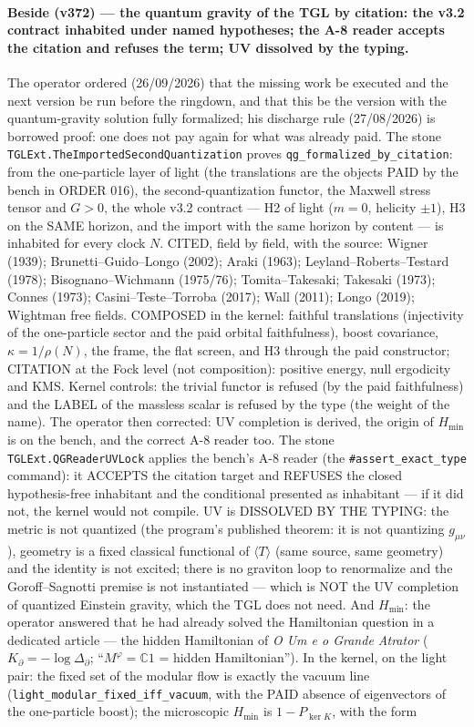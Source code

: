 \documentclass[11pt]{article}
\theoremstyle{definition}\newtheorem{deriv}{Derivation}
\begin{document}
\paragraph*{Beside (v372) --- the quantum gravity of the TGL by citation: the v3.2 contract inhabited under named hypotheses; the A-8 reader accepts the citation and refuses the term; UV dissolved by the typing.} The operator ordered (26/09/2026) that the missing work be executed and the next version be run before the ringdown, and that this be the version with the quantum-gravity solution fully formalized; his discharge rule (27/08/2026) is borrowed proof: one does not pay again for what was already paid. The stone \texttt{TGLExt.TheImportedSecondQuantization} proves \texttt{qg\_formalized\_by\_citation}: from the one-particle layer of light (the translations are the objects PAID by the bench in ORDER 016), the second-quantization functor, the Maxwell stress tensor and $G>0$, the whole v3.2 contract --- H2 of light ($m=0$, helicity $\pm1$), H3 on the SAME horizon, and the import with the same horizon by content --- is inhabited for every clock $N$. CITED, field by field, with the source: Wigner (1939); Brunetti--Guido--Longo (2002); Araki (1963); Leyland--Roberts--Testard (1978); Bisognano--Wichmann (1975/76); Tomita--Takesaki; Takesaki (1973); Connes (1973); Casini--Teste--Torroba (2017); Wall (2011); Longo (2019); Wightman free fields. COMPOSED in the kernel: faithful translations (injectivity of the one-particle sector and the paid orbital faithfulness), boost covariance, $\kappa=1/\rho(N)$, the frame, the flat screen, and H3 through the paid constructor; CITATION at the Fock level (not composition): positive energy, null ergodicity and KMS. Kernel controls: the trivial functor is refused (by the paid faithfulness) and the LABEL of the massless scalar is refused by the type (the weight of the name). The operator then corrected: UV completion is derived, the origin of $H_{\min}$ is on the bench, and the correct A-8 reader too. The stone \texttt{TGLExt.QGReaderUVLock} applies the bench's A-8 reader (the \texttt{\#assert\_exact\_type} command): it ACCEPTS the citation target and REFUSES the closed hypothesis-free inhabitant and the conditional presented as inhabitant --- if it did not, the kernel would not compile. UV is DISSOLVED BY THE TYPING: the metric is not quantized (the program's published theorem: it is not quantizing $g_{\mu\nu}$), geometry is a fixed classical functional of $\langle T\rangle$ (same source, same geometry) and the identity is not excited; there is no graviton loop to renormalize and the Goroff--Sagnotti premise is not instantiated --- which is NOT the UV completion of quantized Einstein gravity, which the TGL does not need. And $H_{\min}$: the operator answered that he had already solved the Hamiltonian question in a dedicated article --- the hidden Hamiltonian of \emph{O Um e o Grande Atrator} ($K_\partial=-\log\Delta_\partial$; ``$M^{\varphi}=\mathbb{C}1$ = hidden Hamiltonian''). In the kernel, on the light pair: the fixed set of the modular flow is exactly the vacuum line (\texttt{light\_modular\_fixed\_iff\_vacuum}, with the PAID absence of eigenvectors of the one-particle boost); the microscopic $H_{\min}$ is $1-P_{\ker K}$, with the form 
\end{document}
